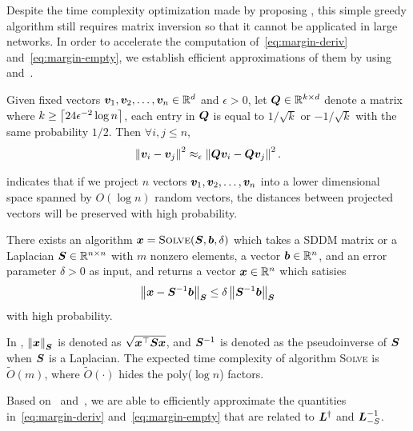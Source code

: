 \documentclass[sigconf]{acmart}
\begin{document}
Despite the time complexity optimization made by proposing , this simple greedy algorithm still requires matrix inversion so that it cannot be applicated in large networks. In order to accelerate the computation of~\eqref{eq:margin-deriv} and~\eqref{eq:margin-empty}, we establish efficient approximations of them by using~ and~.

\begin{lemma}\label{lem:JL}
    Given fixed vectors \(\boldsymbol{v}_1,\boldsymbol{v}_2,\dots,\boldsymbol{v}_n\in\mathbb{R}^d\) and \(\epsilon>0\), let \(\boldsymbol{Q}\in\mathbb{R}^{k\times d}\) denote a matrix where \(k\ge\left\lceil24\epsilon^{-2}\log n\right\rceil\), each entry in \(\boldsymbol{Q}\) is equal to \(1/\sqrt k\) or \(-1/\sqrt k\) with the same probability \(1/2\). Then \(\forall i,j\le n\),
    \begin{equation}\label{eq:JL}
        \left\Vert\boldsymbol{v}_i-\boldsymbol{v}_j\right\Vert^2\approx_\epsilon\left\Vert\boldsymbol{Q}\boldsymbol{v}_i-\boldsymbol{Q}\boldsymbol{v}_j\right\Vert^2.
    \end{equation}
\end{lemma}
 indicates that if we project \(n\) vectors \(\boldsymbol{v}_1,\boldsymbol{v}_2,\dots,\boldsymbol{v}_n\) into a lower dimensional space spanned by \(O(\log n)\) random vectors, the distances between projected vectors will be preserved with high probability.

\begin{lemma}\label{lem:solver}
    There exists an algorithm \(\boldsymbol{x}=\textsc{Solve}(\boldsymbol{S},\boldsymbol{b},\delta)\) which takes a SDDM matrix or a Laplacian \(\boldsymbol{S}\in\mathbb{R}^{n\times n}\) with \(m\) nonzero elements, a vector \(\boldsymbol{b}\in\mathbb{R}^n\), and an error parameter \(\delta>0\) as input, and returns a vector \(\boldsymbol{x}\in\mathbb{R}^n\) which satisies
    \[\left\Vert\boldsymbol{x}-\boldsymbol{S}^{-1}\boldsymbol{b}\right\Vert_{\boldsymbol{S}}\le\delta\left\Vert\boldsymbol{S}^{-1}\boldsymbol{b}\right\Vert_{\boldsymbol{S}}\]
    with high probability.
\end{lemma}

In , \(\left\Vert\boldsymbol{x}\right\Vert_{\boldsymbol{S}}\) is denoted as \(\sqrt{\boldsymbol{x}^\top\boldsymbol{S}\boldsymbol{x}}\), and \(\boldsymbol{S}^{-1}\) is denoted as the pseudoinverse of \(\boldsymbol{S}\) when \(\boldsymbol{S}\) is a Laplacian.
The expected time complexity of algorithm \textsc{Solve} is \(\tilde{O}(m)\), where \(\tilde{O}(\cdot)\) hides the poly(\(\log n\)) factors.

Based on~ and~, we are able to efficiently approximate the quantities in~\eqref{eq:margin-deriv} and~\eqref{eq:margin-empty} that are related to \(\boldsymbol{L}^\dagger\) and \(\boldsymbol{L}_{-S}^{-1}\).
\end{document}
